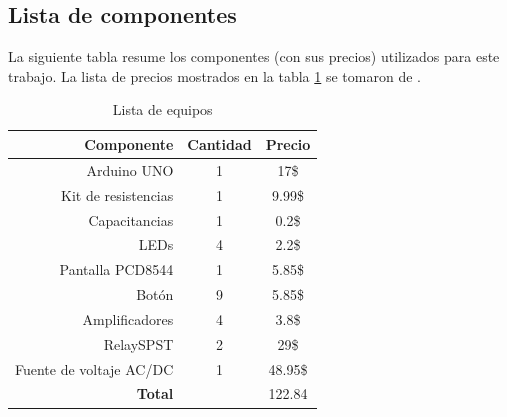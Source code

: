 \subsection*{Lista de componentes}
La siguiente tabla resume los componentes (con sus precios) utilizados para este trabajo. La lista de precios mostrados en la tabla \ref{table_2} se tomaron de \cite{web4}. %
\begin{table}[H]
\caption{Lista de equipos}
\label{table_2}
\begin{center}
\begin{tabular}{r|cc}
\hline
\textbf{Componente}&\textbf{Cantidad}&\textbf{Precio}\\
 \hline
Arduino UNO&1   &17\$ \\ \hline 
Kit de resistencias &1   &9.99\$ \\ \hline 
Capacitancias&1   &0.2\$ \\ \hline 
LEDs&4   &2.2\$ \\ \hline 
Pantalla PCD8544&1   &5.85\$ \\ \hline 
Botón&9   &5.85\$ \\ \hline 
Amplificadores&4   &3.8\$ \\ \hline 
RelaySPST & 2 & 29\$ \\ \hline 
Fuente de voltaje AC/DC& 1&48.95\$\\ \hline 

 \textbf{Total}& &  122.84\\
 \hline
\end{tabular}
\end{center}
\end{table}

